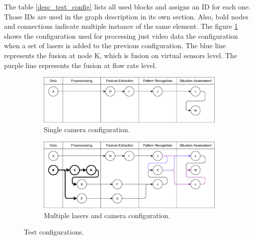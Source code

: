 The table \ref{desc_test_config} lists all used blocks and assigns an ID for each one. Those IDs are used in the graph description in its own section. Also, bold nodes and connections indicate multiple instance of the same element. The figure \ref{tconf2} shows the  configuration used for processing just video data the configuration when a set of lasers is added to the previous configuration. The blue line represents the fusion at node K, which is fusion on virtual sensors level. The purple line represents the fusion at flow rate level.


\begin{figure}[ht!]

\begin{subfigure}{\textwidth}

\includegraphics[scale=0.6]{fig/4/test_configuration1.pdf}
\caption{Single camera configuration.}
\end{subfigure}


\begin{subfigure}{\textwidth}
\includegraphics[scale=0.6]{fig/4/test_configuration2.pdf}
\caption{Multiple lasers and camera configuration.}

\end{subfigure}
\caption{Test configurations.}
\label{tconf2}
\end{figure}


